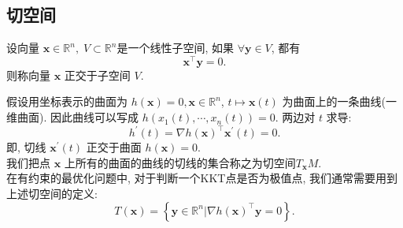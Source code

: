 \documentclass[lang = cn]{elegantpaper}
\begin{document}
\subsection{切空间}
\noindent
\begin{definition}
    设向量 $\bm{x} \in \mathbb{R}^n,\; V \subset \mathbb{R}^n$是一个线性子空间, 如果 $\forall \bm{y} \in V$, 都有
\begin{equation*}
    \bm{x}^\top \bm{y} = 0.
\end{equation*}
则称向量 $\bm{x}$ 正交于子空间 $V$.
\end{definition}
\noindent
假设用坐标表示的曲面为 $h(\bm{x}) = 0,\bm{x} \in \mathbb{R}^n$, $t \mapsto \bm{x}(t)$ 为曲面上的一条曲线(一维曲面). 因此曲线可以写成 $h(x_1(t),\cdots,x_n(t)) = 0$. 两边对 $t$ 求导:
\begin{equation*}
    h^{'}(t) = \nabla h(\bm{x})^\top \bm{x}^{'}(t) = 0.
\end{equation*}
即, 切线 $\bm{x}^{'}(t)$ 正交于曲面 $h(\bm{x})=0$.\\
我们把点 $\bm{x}$ 上所有的曲面的曲线的切线的集合称之为切空间$T_{\bm{x}}M$.\\
在有约束的最优化问题中, 对于判断一个KKT点是否为极值点, 我们通常需要用到上述切空间的定义:
\begin{equation*}
    T(\bm{x}) = \left\{\bm{y}\in\mathbb{R}^n|\nabla h(\bm{x})^\top \bm{y} = 0\right\}.
\end{equation*}
\end{document}
